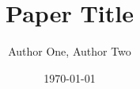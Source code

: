 \documentclass[11pt]{article}
\newcommand{\papertitle}{Paper Title}
\newcommand{\paperauthors}{Author One, Author Two}
\begin{document}
\title{\papertitle}
\author{\paperauthors}
\date{\today}
\maketitle



\printbibliography
\end{document}

